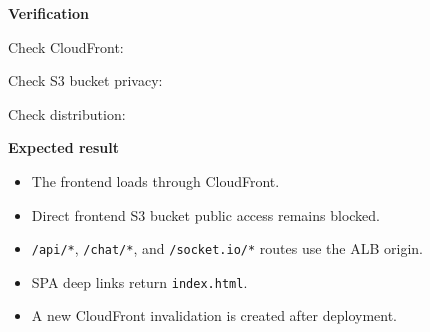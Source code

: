 \vspace{0.5em}\noindent\textbf{Verification}\par

Check CloudFront:

\begin{Shaded}
\begin{Highlighting}[]
 
 
 
\end{Highlighting}
\end{Shaded}

Check S3 bucket privacy:

\begin{Shaded}
\begin{Highlighting}[]
\DataTypeTok{\textbackslash{}}
  \OperatorTok{\textless{}}\OperatorTok{\textgreater{}}
\end{Highlighting}
\end{Shaded}

Check distribution:

\begin{Shaded}
\begin{Highlighting}[]
\end{Highlighting}
\end{Shaded}

\vspace{0.5em}\noindent\textbf{Expected result}\par

\begin{itemize}
\tightlist
\item
  The frontend loads through CloudFront.
\item
  Direct frontend S3 bucket public access remains blocked.
\item
  \texttt{/\allowbreak{}api/\allowbreak{}*}, \texttt{/\allowbreak{}chat/\allowbreak{}*}, and \texttt{/\allowbreak{}socket.\allowbreak{}io/\allowbreak{}*} routes
  use the ALB origin.
\item
  SPA deep links return \texttt{index.\allowbreak{}html}.
\item
  A new CloudFront invalidation is created after deployment.
\end{itemize}

